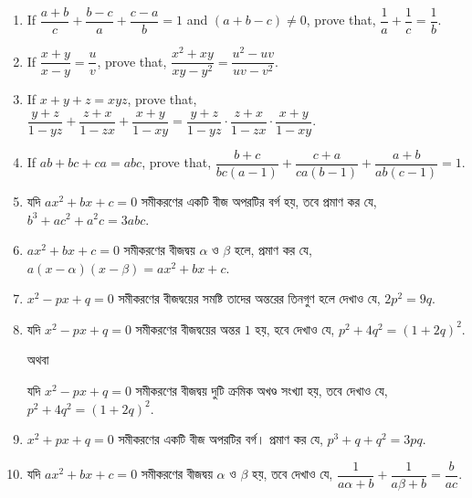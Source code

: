 \documentclass[11pt, a4paper]{article}
\begin{document}
\begin{enumerate}
	\item If $\dfrac{a+b}{c} + \dfrac{b-c}{a} + \dfrac{c-a}{b} = 1$ and $(a+b-c) \neq 0$, prove that, $\dfrac{1}{a} + \dfrac{1}{c} = \dfrac{1}{b}$.
	
	\item If $\dfrac{x+y}{x-y} = \dfrac{u}{v}$, prove that, $\dfrac{x^2 + xy}{xy - y^2} = \dfrac{u^2 - uv}{uv - v^2}$.
	
	\item If $x+y+z = xyz$, prove that, $\dfrac{y+z}{1-yz} + \dfrac{z+x}{1-zx} + \dfrac{x+y}{1-xy} = \dfrac{y+z}{1-yz} \cdot \dfrac{z+x}{1-zx} \cdot \dfrac{x+y}{1-xy}$.
	
	\item If $ab+bc+ca = abc$, prove that, $\dfrac{b+c}{bc(a-1)} + \dfrac{c+a}{ca(b-1)} + \dfrac{a+b}{ab(c-1)} = 1$.

	\item \textbengali{যদি} $ax^2 + bx + c = 0$ \textbengali{সমীকরণের একটি বীজ অপরটির বর্গ হয়, তবে প্রমাণ কর যে,} $b^3 + ac^2 + a^2 c = 3abc$.
	
	\item $ax^2 + bx + c = 0$ \textbengali{সমীকরণের বীজদ্বয়} $\alpha$ \textbengali{ও} $\beta$ \textbengali{হলে, প্রমাণ কর যে,} $a(x-\alpha) (x-\beta) = ax^2 + bx + c$.
	
	\item $x^2 - px + q = 0$ \textbengali{সমীকরণের বীজদ্বয়ের সমষ্টি তাদের অন্তরের তিনগুণ হলে দেখাও যে,} $2p^2 = 9q$.
	
	\item \textbengali{যদি} $x^2 - px + q = 0$ \textbengali{সমীকরণের বীজদ্বয়ের অন্তর} $1$ \textbengali{হয়, হবে দেখাও যে,} $p^2 + 4q^2 = (1+2q)^2$.
		\begin{center}
		\textbengali{অথবা}
		\end{center}
		\textbengali{যদি} $x^2 - px + q = 0$ \textbengali{সমীকরণের বীজদ্বয় দুটি ক্রমিক অখণ্ড সংখ্যা হয়,}  \textbengali{তবে দেখাও যে,} $p^2 + 4q^2 = (1+2q)^2$.
		
	\item $x^2 + px + q = 0$ \textbengali{সমীকরণের একটি বীজ অপরটির বর্গ। প্রমাণ কর যে,} $p^3 + q + q^2 = 3pq$.
	
	\item \textbengali{যদি} $ax^2 + bx + c = 0$ \textbengali{সমীকরণের বীজদ্বয়} $\alpha$ \textbengali{ও} $\beta$ \textbengali{হয়, তবে দেখাও যে,} $\dfrac{1}{a\alpha + b} + \dfrac{1}{a\beta + b} = \dfrac{b}{ac}$.
\end{enumerate}
\end{document}
